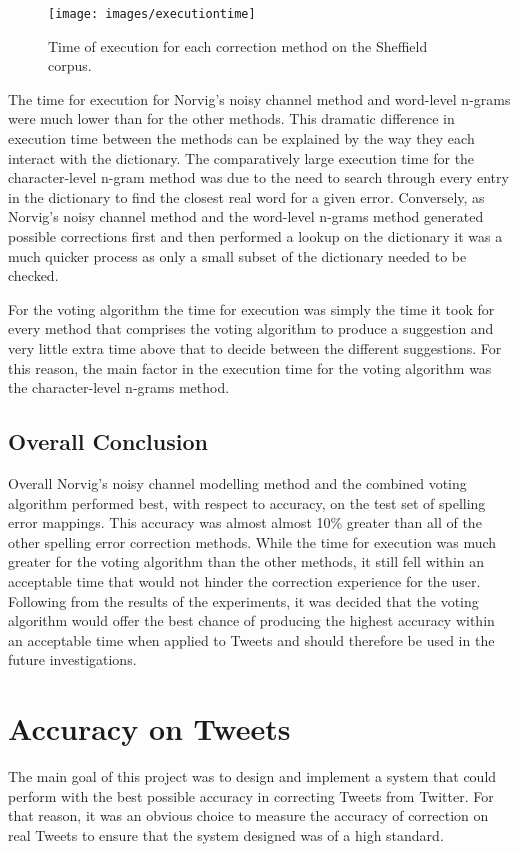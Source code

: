 \begin{figure}[H]
	\centering
	\label{fig:timechart}
	\texttt{[image: images/executiontime]}
	\caption{Time of execution for each correction method on the Sheffield corpus.}
\end{figure}

The time for execution for Norvig's noisy channel method and word-level n-grams were much lower than for the other methods. This dramatic difference in execution time between the methods can be explained by the way they each interact with the dictionary. The comparatively large execution time for the character-level n-gram method was due to the need to search through every entry in the dictionary to find the closest real word for a given error. Conversely, as Norvig's noisy channel method and the word-level n-grams method generated possible corrections first and then performed a lookup on the dictionary it was a much quicker process as only a small subset of the dictionary needed to be checked.

For the voting algorithm the time for execution was simply the time it took for every method that comprises the voting algorithm to produce a suggestion and very little extra time above that to decide between the different suggestions. For this reason, the main factor in the execution time for the voting algorithm was the character-level n-grams method.

\subsection{Overall Conclusion}
Overall Norvig's noisy channel modelling method and the combined voting algorithm performed best, with respect to accuracy, on the test set of spelling error mappings. This accuracy was almost almost 10\% greater than all of the other spelling error correction methods. While the time for execution was much greater for the voting algorithm than the other methods, it still fell within an acceptable time that would not hinder the correction experience for the user. Following from the results of the experiments, it was decided that the voting algorithm would offer the best chance of producing the highest accuracy within an acceptable time when applied to Tweets and should therefore be used in the future investigations.

\section{Accuracy on Tweets}
The main goal of this project was to design and implement a system that could perform with the best possible accuracy in correcting Tweets from Twitter. For that reason, it was an obvious choice to measure the accuracy of correction on real Tweets to ensure that the system designed was of a high standard.

